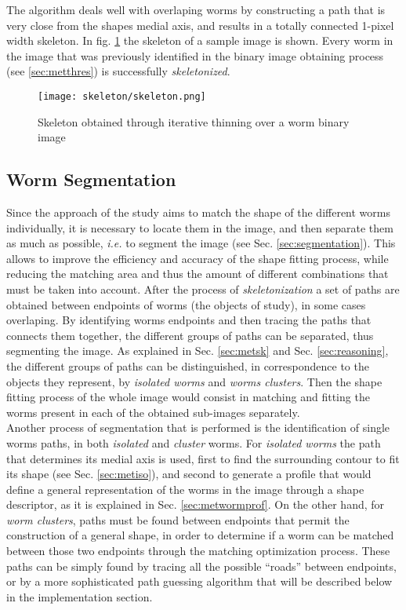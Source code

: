 The algorithm deals well with overlaping worms by constructing a path that is very close
from the shapes medial axis, and results in a totally connected 1-pixel width skeleton.
In fig. \ref{fig:skeleton} the skeleton of a sample image is shown. Every worm in the 
image that was previously identified in the binary image obtaining process 
(see \ref{sec:metthres}) is successfully \emph{skeletonized}.

\begin{figure}[h t b p ! H]
 \centering
   \texttt{[image: skeleton/skeleton.png]}
 \caption{Skeleton obtained through iterative thinning over a worm binary image}
\label{fig:skeleton}
\end{figure} 


\subsection{Worm Segmentation}
\label{sec:metsegmentation}

Since the approach of the study aims to match the shape of the different worms
individually, it is necessary to locate them in the image, and then separate them 
as much as possible, \emph{i.e.} to segment the image (see Sec. \ref{sec:segmentation}). 
This allows to improve the efficiency and accuracy of the 
shape fitting process, while reducing the matching area and thus the amount of 
different combinations that must be taken into account. After the process of 
\emph{skeletonization} a set of paths are obtained 
between endpoints of worms (the objects of study), in some cases overlaping. 
By identifying worms endpoints and then tracing the paths that connects them together,
the different groups of paths can be separated, thus segmenting the image.
As explained in Sec. \ref{sec:metsk} and Sec. \ref{sec:reasoning}, the different groups
of paths can be distinguished, in correspondence to the objects they represent,
by \emph{isolated worms} and \emph{worms clusters}. Then the shape fitting process
of the whole image would consist in matching and fitting the worms present in each of
the obtained sub-images separately.\\

Another process of segmentation that is performed is the identification of single
worms paths, in both \emph{isolated} and \emph{cluster} worms. For \emph{isolated worms}
the path that determines its medial axis is used, first to find the surrounding contour to
fit its shape (see Sec. \ref{sec:metiso}), and second to generate a profile that 
would define a general representation of the worms in the image through a shape
descriptor, as it is explained in Sec. \ref{sec:metwormprof}.
On the other hand, for \emph{worm clusters}, paths must be found between endpoints that
permit the construction of a general shape, in order to determine if a worm can be matched
between those two endpoints through the matching optimization process. These paths can
be simply found by tracing all the possible ``roads'' between endpoints, or by
a more sophisticated path guessing algorithm that will be described below in the
implementation section.



